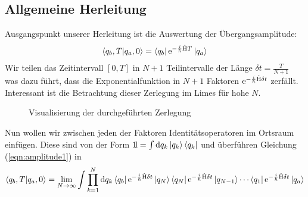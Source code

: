 \subsection{Allgemeine Herleitung}
Ausgangspunkt unserer Herleitung ist die Auswertung der Übergangsamplitude:
\begin{align}
	\braket{q_b,T}{q_a,0} = \bra{q_b}\operatorname{e}^{-\frac{i}{\hbar}\hat{\operatorname{H}}T}\ket{q_a} \label{eqn:amplitude1}
\end{align}
Wir teilen das Zeitintervall $[0,T]$ in $N+1$ Teilintervalle der Länge $\delta t = \frac{T}{N+1}$ was dazu führt, dass die Exponentialfunktion in $N+1$ Faktoren $\operatorname{e}^{-\frac{i}{\hbar}\hat{\operatorname{H}}\delta t}$ zerfällt. Interessant ist die Betrachtung dieser Zerlegung im Limes für hohe $N$. 
\begin{figure}[H]
\centering
{}
\caption{Visualisierung der durchgeführten Zerlegung}
\end{figure}
Nun wollen wir zwischen jeden der Faktoren Identitätsoperatoren im Ortsraum einfügen. Diese sind von der Form 
	$\mathrm{1\!l} = \int \dd q_k \ket{q_k}\bra{q_k}$ und überführen Gleichung (\ref{eqn:amplitude1}) in 
\begin{align}
	\braket{q_b,T}{q_a,0} = \lim_{N\rightarrow\infty} \int \prod_{k=1}^{N} \dd q_k \bra{q_b}\operatorname{e}^{-\frac{i}{\hbar}\hat{\operatorname{H}}\delta t}\ket{q_N}\bra{q_N}\operatorname{e}^{-\frac{i}{\hbar}\hat{\operatorname{H}}\delta t}\ket{q_{N-1}} \cdots \bra{q_1}\operatorname{e}^{-\frac{i}{\hbar}\hat{\operatorname{H}}\delta t}\ket{q_a} \label{eqn:amplitude2}
\end{align}
